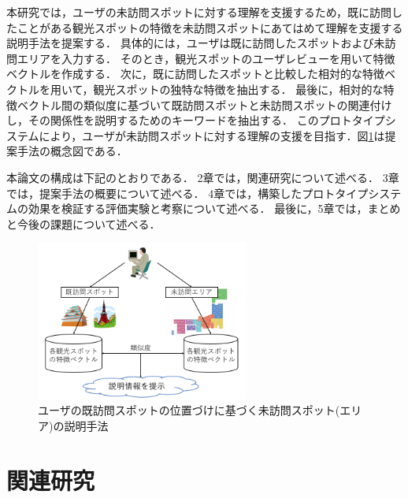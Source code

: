 \documentclass{deimj}
\begin{document}
本研究では，ユーザの未訪問スポットに対する理解を支援するため，既に訪問したことがある観光スポットの特徴を未訪問スポットにあてはめて理解を支援する説明手法を提案する．
具体的には，ユーザは既に訪問したスポットおよび未訪問エリアを入力する．
そのとき，観光スポットのユーザレビューを用いて特徴ベクトルを作成する．
次に，既に訪問したスポットと比較した相対的な特徴ベクトルを用いて，観光スポットの独特な特徴を抽出する．
最後に，相対的な特徴ベクトル間の類似度に基づいて既訪問スポットと未訪問スポットの関連付けし，その関係性を説明するためのキーワードを抽出する．
このプロトタイプシステムにより，ユーザが未訪問スポットに対する理解の支援を目指す．図\ref{fig:Photo_Image}は提案手法の概念図である．

本論文の構成は下記のとおりである．
2章では，関連研究について述べる．
3章では，提案手法の概要について述べる．
4章では，構築したプロトタイプシステムの効果を検証する評価実験と考察について述べる．
最後に，5章では，まとめと今後の課題について述べる．

\begin{figure}[t]
  \begin{center}
    \includegraphics[clip,width=7.0cm]{picture/Photo_Image_jap.png}
    \caption{ユーザの既訪問スポットの位置づけに基づく未訪問スポット(エリア)の説明手法}
    \label{fig:Photo_Image}
   \end{center}
\end{figure}


\section{関連研究}
\label{sec:関連研究}
\end{document}
